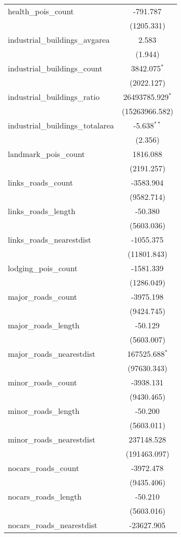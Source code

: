 \begin{table}[!htbp]
\begin{tabular}{@{\extracolsep{5pt}}lc}
 health_pois_count & -791.787$^{}$ \\
  & (1205.331) \\
 industrial_buildings_avgarea & 2.583$^{}$ \\
  & (1.944) \\
 industrial_buildings_count & 3842.075$^{*}$ \\
  & (2022.127) \\
 industrial_buildings_ratio & 26493785.929$^{*}$ \\
  & (15263966.582) \\
 industrial_buildings_totalarea & -5.638$^{**}$ \\
  & (2.356) \\
 landmark_pois_count & 1816.088$^{}$ \\
  & (2191.257) \\
 links_roads_count & -3583.904$^{}$ \\
  & (9582.714) \\
 links_roads_length & -50.380$^{}$ \\
  & (5603.036) \\
 links_roads_nearestdist & -1055.375$^{}$ \\
  & (11801.843) \\
 lodging_pois_count & -1581.339$^{}$ \\
  & (1286.049) \\
 major_roads_count & -3975.198$^{}$ \\
  & (9424.745) \\
 major_roads_length & -50.129$^{}$ \\
  & (5603.007) \\
 major_roads_nearestdist & 167525.688$^{*}$ \\
  & (97630.343) \\
 minor_roads_count & -3938.131$^{}$ \\
  & (9430.465) \\
 minor_roads_length & -50.200$^{}$ \\
  & (5603.011) \\
 minor_roads_nearestdist & 237148.528$^{}$ \\
  & (191463.097) \\
 nocars_roads_count & -3972.478$^{}$ \\
  & (9435.406) \\
 nocars_roads_length & -50.210$^{}$ \\
  & (5603.016) \\
 nocars_roads_nearestdist & -23627.905$^{}$ \\

\end{tabular}
\end{table}
